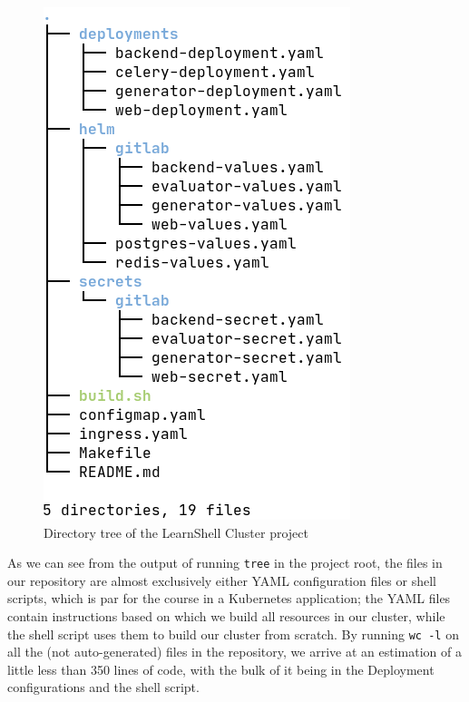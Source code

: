\documentclass[thesis=B,english]{FITthesis}[2019/12/23]
\begin{document}
\begin{figure}[H]
\caption{Directory tree of the LearnShell Cluster project}
\hspace*{3.5cm}
\includegraphics[scale=0.5]{tree}
\end{figure}


As we can see from the output of running \verb|tree| in the project root, the files in our repository are almost exclusively either YAML configuration files or shell scripts, which is par for the course in a Kubernetes application; the YAML files contain instructions based on which we build all resources in our cluster, while the shell script uses them to build our cluster from scratch. By running \verb|wc -l| on all the (not auto-generated) files in the repository, we arrive at an estimation of a little less than 350 lines of code, with the bulk of it being in the Deployment configurations and the shell script.
\end{document}
